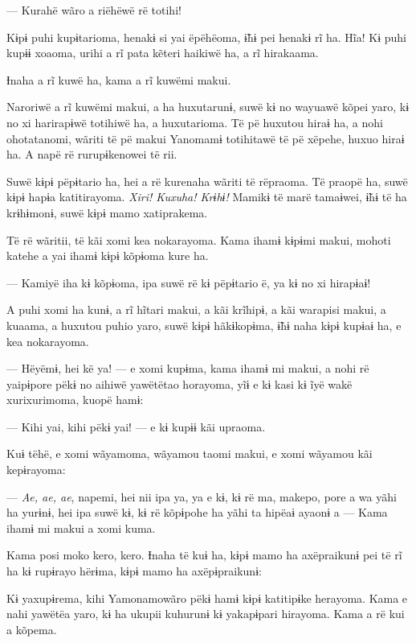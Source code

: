 --- Kurahë wãro a riëhëwë rë totihi! 

Kɨpɨ puhi kupɨtarioma, henakɨ si yai ëpëhëoma, ɨ̃hɨ pei henakɨ rĩ ha.
Hĩa! Kɨ puhi kupɨɨ xoaoma, urihi a rĩ pata kẽteri haikiwë ha, a rĩ
hirakaama. 

Ɨnaha a rĩ kuwë ha, kama a rĩ kuwëmi makui. 

Naroriwë a rĩ kuwëmi makui, a ha huxutarunɨ, suwë kɨ no wayuawë kõpei
yaro, kɨ no xi harirapɨwë totihiwë ha, a huxutarioma. Të pë huxutou
hiraɨ ha, a nohi ohotatanomi, wãriti të pë makui Yanomamɨ totihitawë të
pë xëpehe, huxuo hiraɨ ha. A napë rë rurupɨkenowei të rii. 

Suwë kɨpɨ pëpɨtario ha, hei a rë kurenaha wãriti të rëpraoma. Të praopë
ha, suwë kɨpɨ hapɨa katitirayoma. \textit{Xiri! Kuxuha! Krɨhɨ!} Mamikɨ të marë
tamaɨwei, ɨ̃hɨ të ha krɨhɨmonɨ, suwë kɨpɨ mamo xatiprakema. 

Të rë wãritii, të kãi xomi kea nokarayoma. Kama ihamɨ kɨpɨmi makui,
mohoti katehe a yai ihamɨ kɨpɨ kõpɨoma kure ha. 

--- Kamiyë iha kɨ kõpɨoma, ipa suwë rë kɨ pëpɨtario ë, ya kɨ no xi
hirapɨaɨ! 

A puhi xomi ha kunɨ, a rĩ hĩtari makui, a kãi krĩhipɨ, a kãi warapisi
makui, a kuaama, a huxutou puhio yaro, suwë kɨpɨ hãkɨkopɨma, ɨ̃hɨ naha
kɨpɨ kupɨaɨ ha, e kea nokarayoma. 

--- Hëyëmɨ, hei kë ya! --- e xomi kupɨma, kama ihamɨ mi makui, a nohi rë
yaipɨpore pëkɨ no aihiwë yawëtëtao horayoma, yĩɨ e kɨ kasi kɨ ĩyë wakë
xurixurimoma, kuopë hamɨ: 

--- Kihi yai, kihi pëkɨ yai! --- e kɨ kupɨɨ kãi upraoma. 

Kuɨ tëhë, e xomi wãyamoma, wãyamou taomi makui, e xomi wãyamou kãi
kepɨrayoma: 

--- \textit{Ae, ae, ae}, napemi, hei nii ipa ya, ya e kɨ, kɨ rë ma, makepo, pore
a wa yãhi ha yurɨnɨ, hei ipa suwë kɨ, kɨ rë kõpɨpohe ha yãhi ta hipëaɨ
ayaonɨ a --- Kama ihamɨ mi makui a xomi kuma. 

Kama posi moko kero, kero. Ɨnaha të kuɨ ha, kɨpɨ mamo ha axëpraikunɨ pei
të rĩ ha kɨ rupɨrayo hërɨma, kɨpɨ mamo ha axëpɨpraikunɨ:


Kɨ yaxupɨrema, kihi Yamonamowãro pëkɨ hamɨ kɨpɨ katitipɨke herayoma.
Kama e nahi yawëtëa yaro, kɨ ha ukupii kuhurunɨ kɨ yakapɨpari hirayoma.
Kama a rë kui a kõpema. 


